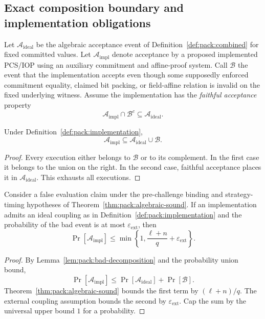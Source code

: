 \subsection{Exact composition boundary and implementation obligations}\label{sec:packing:boundary}

\begin{definition}\label{def:pack:implementation}
Let $\mathcal A_{\mathrm{ideal}}$ be the algebraic
acceptance event of Definition~\ref{def:pack:combined}
for fixed committed values. Let
$\mathcal A_{\mathrm{impl}}$ denote acceptance by
a proposed implemented PCS/IOP using an
auxiliary commitment and affine-proof system.
Call $\mathcal B$ the event that the implementation
accepts even though some supposedly enforced
commitment equality, claimed bit packing, or
field-affine relation is invalid on the
fixed underlying witness.
Assume the implementation has the
\emph{faithful acceptance} property
\[
 \mathcal A_{\mathrm{impl}}\cap\mathcal B^c
       \subseteq\mathcal A_{\mathrm{ideal}}.
\]
\end{definition}

\begin{lemma}\label{lem:pack:bad-decomposition}
Under Definition~\ref{def:pack:implementation},
\[
 \mathcal A_{\mathrm{impl}}
 \subseteq \mathcal A_{\mathrm{ideal}}\cup\mathcal B.
\]
\end{lemma}
\begin{proof}
Every execution either belongs to $\mathcal B$
or to its complement. In the first case
it belongs to the union on the right.
In the second case, faithful acceptance
places it in $\mathcal A_{\mathrm{ideal}}$.
This exhausts all executions.
\end{proof}

\begin{proposition}\label{prop:pack:external-composition}
Consider a false evaluation claim under the
pre-challenge binding and strategy-timing
hypotheses of
Theorem~\ref{thm:pack:algebraic-sound}.
If an implementation admits an ideal
coupling as in Definition~\ref{def:pack:implementation}
and the probability of the bad event is
at most $\varepsilon_{\mathrm{ext}}$, then
\[
 \boxed{
 \Pr[\mathcal A_{\mathrm{impl}}]
 \leq
 \min\left\{1,\frac{\ell+n}{q}
                    +\varepsilon_{\mathrm{ext}}\right\}.
 }
\]
\end{proposition}
\begin{proof}
By Lemma~\ref{lem:pack:bad-decomposition}
and the probability union bound,
\[
 \Pr[\mathcal A_{\mathrm{impl}}]
 \leq\Pr[\mathcal A_{\mathrm{ideal}}]
           +\Pr[\mathcal B].
\]
Theorem~\ref{thm:pack:algebraic-sound}
bounds the first term by $(\ell+n)/q$.
The external coupling assumption bounds
the second by $\varepsilon_{\mathrm{ext}}$.
Cap the sum by the universal upper
bound $1$ for a probability.
\end{proof}

